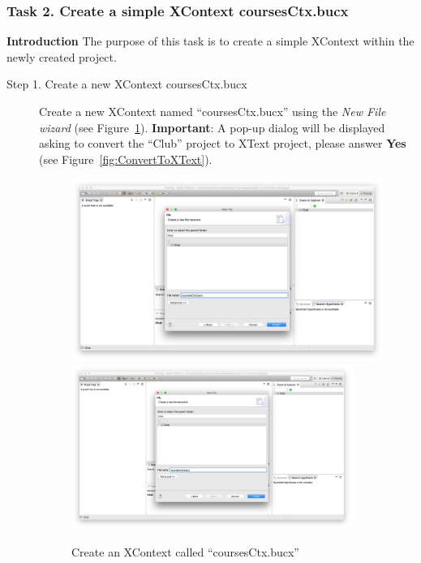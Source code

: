\subsubsection{Task 2. Create a simple XContext coursesCtx.bucx}\label{Sec:SimpleContext}
\textbf{Introduction} The purpose of this task is to create a simple XContext within the newly created project.
\begin{description}
\item[Step 1. Create a new XContext coursesCtx.bucx] Create a new XContext named ``coursesCtx.bucx'' using the \emph{New File wizard} (see Figure~\ref{fig:CreateCoursesCtx}).
         \textbf{Important}: A pop-up dialog will be displayed asking to convert the ``Club''
         project to XText project, please answer \textbf{Yes} (see Figure~\ref{fig:ConvertToXText}).
\begin{figure}[!htbp]
  \centering
  \ifplastex
  \includegraphics[width=512]{figures/CreateCoursesCtx}
  \else
  \includegraphics[width=0.9\textwidth]{figures/CreateCoursesCtx}
  \fi
  \caption{Create an XContext called ``coursesCtx.bucx''}
  \label{fig:CreateCoursesCtx}
\end{figure}

\end{description}
